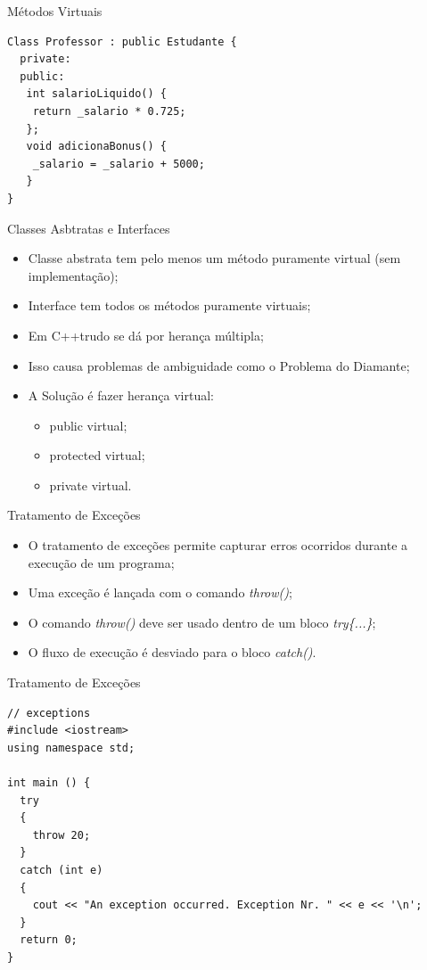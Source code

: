 \documentclass[12pt,table,xcolor={dvipsnames}]{beamer}
\begin{document}
\begin{frame}[fragile]{Métodos Virtuais}
\begin{lstlisting}
Class Professor : public Estudante {
  private:
  public:
   int salarioLiquido() {
    return _salario * 0.725;
   };
   void adicionaBonus() {
    _salario = _salario + 5000;
   }
}
\end{lstlisting}
\end{frame}

\begin{frame}{Classes Asbtratas e Interfaces}
\begin{itemize}
\item Classe abstrata tem pelo menos um método puramente virtual (sem implementação);
\item Interface tem todos os métodos puramente virtuais;
\item Em C++trudo se dá por herança múltipla;
\item Isso causa problemas de ambiguidade como o Problema do Diamante;
\item A Solução é fazer herança virtual:
\begin{itemize}
\item public virtual;
\item protected virtual;
\item private virtual.
\end{itemize}
\end{itemize}
\end{frame}

\begin{frame}{Tratamento de Exceções}
\begin{itemize}
\item O tratamento de exceções permite capturar erros ocorridos durante a execução de um programa;
\item Uma exceção é lançada com o comando \textit{throw()};
\item O comando \textit{throw()} deve ser usado dentro de um bloco \textit{try\{...\}};
\item O fluxo de execução é desviado para o bloco \textit{catch()}.
\end{itemize}
\end{frame}

\begin{frame}[fragile]{Tratamento de Exceções}
\begin{lstlisting}
// exceptions
#include <iostream>
using namespace std;

int main () {
  try
  {
    throw 20;
  }
  catch (int e)
  {
    cout << "An exception occurred. Exception Nr. " << e << '\n';
  }
  return 0;
}
\end{lstlisting}
\end{frame}
\end{document}
